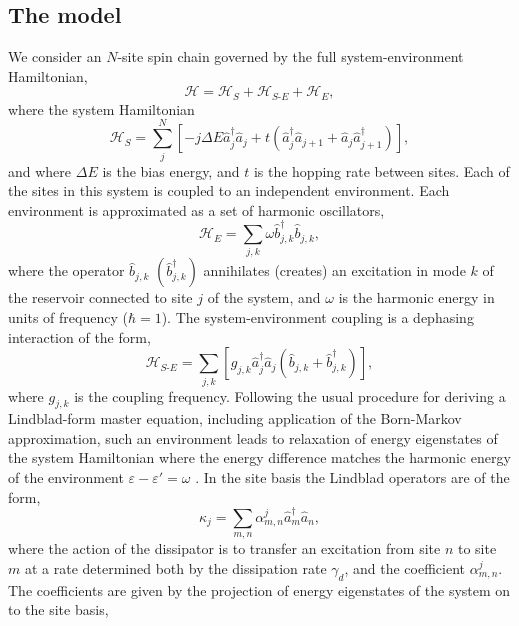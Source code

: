 \subsection{The model}
We consider an \(N\)-site spin chain governed by the full system-environment Hamiltonian,
\begin{equation}
	\mathcal{H} = \mathcal{H}_{S} + \mathcal{H}_{S\text{-}E} + \mathcal{H}_{E},
	\label{eq:fw1-0}
\end{equation}
where the system Hamiltonian
\begin{equation}
	\mathcal{H}_{S} = \sum_{j}^{N}\left[ -j \Delta E \hat{a}_{j}^{\dagger}\hat{a}_{j} + t\left( \hat{a}_{j}^{\dagger}\hat{a}_{j+1} + \hat{a}_{j}\hat{a}_{j+1}^{\dagger}\right)\right],
	\label{eq:fw1-1}
\end{equation}
and where \(\Delta E\) is the bias energy, and \(t\) is the hopping rate between sites. Each of the sites in this system is coupled to an independent environment. Each environment is approximated as a set of harmonic oscillators,
\begin{equation}
	\mathcal{H}_{E} = \sum_{j,k} \omega\hat{b}_{j,k}^{\dagger}\hat{b}_{j,k},
	\label{eq:fw1-3}
\end{equation}
where the operator \(\hat{b}_{j,k}\) \((\hat{b}_{j,k}^{\dagger})\) annihilates (creates) an excitation in mode \(k\) of the reservoir connected to site \(j\) of the system, and \(\omega\) is the harmonic energy in units of frequency (\(\hbar = 1\)). The system-environment coupling is a dephasing interaction of the form,
\begin{equation}
	\mathcal{H}_{S\text{-}E} = \sum_{j,k} \left[ g_{j,k}\hat{a}_{j}^{\dagger}\hat{a}_{j}\left( \hat{b}_{j,k} + \hat{b}_{j,k}^{\dagger} \right)\right],
	\label{eq:fw1-4}
\end{equation}
where \(g_{j,k}\) is the coupling frequency. Following the usual procedure for deriving a Lindblad-form master equation, including application of the Born-Markov approximation, such an environment leads to relaxation of energy eigenstates of the system Hamiltonian where the energy difference matches the harmonic energy of the environment \(\varepsilon - \varepsilon' = \omega\) \cite{Beaudoin2011}. In the site basis the Lindblad operators are of the form,
\begin{equation}
	\kappa_{j} = \sum_{m,n} \alpha_{m,n}^{j} \hat{a}_{m}^{\dagger}\hat{a}_{n},
	\label{eq:fw1-5}
\end{equation}
where the action of the dissipator is to transfer an excitation from site \(n\) to site \(m\) at a rate determined both by the dissipation rate \(\gamma_{d}\), and the coefficient \(\alpha_{m,n}^{j}\). The coefficients are given by the projection of energy eigenstates of the system on to the site basis,
